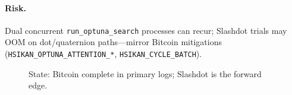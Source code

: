 \documentclass{article}
\begin{document}
\paragraph{Risk.}
Dual concurrent \texttt{run\_optuna\_search} processes can recur; Slashdot
trials may OOM on dot/quaternion paths---mirror Bitcoin mitigations
(\texttt{HSIKAN\_OPTUNA\_ATTENTION\_*}, \texttt{HSIKAN\_CYCLE\_BATCH}).

\begin{figure}[h]
\centering

\caption{State: Bitcoin complete in primary logs; Slashdot is the forward edge.}
\end{figure}
\end{document}
